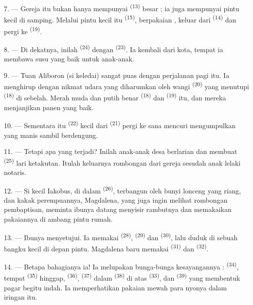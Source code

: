 7. --- Gereja itu bukan hanya mempunyai 
\textsuperscript{(13)} besar ; ia juga mempunyai pintu kecil di
samping. Melalui pintu kecil itu  \textsuperscript{(15)},
berpakaian , keluar dari 
\textsuperscript{(14)} dan pergi ke 
\textsuperscript{(19)}.

8. --- Di dekatnya, inilah 
\textsuperscript{(24)} dengan  \textsuperscript{(23)}.
Ia kembali dari kota, tempat ia membawa susu yang baik untuk
anak-anak.

\VUsaut{4.0mm}
\VUsaut{3.4mm}

9. --- Tuan Aliboron (si keledai) sangat puas dengan perjalanan pagi
itu. Ia menghirup dengan nikmat udara yang diharumkan oleh wangi
 \textsuperscript{(20)} yang menutupi  \textsuperscript{(18)} di  sebelah. Merah muda
dan putih benar  \textsuperscript{(18)} dan
 \textsuperscript{(19)} itu, dan mereka
menjanjikan panen yang baik.

10. --- Sementara itu  \textsuperscript{(22)} kecil
dari  \textsuperscript{(21)} pergi ke sana mencuri
mengumpulkan  yang manis sambil berdengung.

11. --- Tetapi apa yang terjadi? Inilah anak-anak desa berlarian dan
membuat  \textsuperscript{(25)} lari ketakutan.
Itulah keluarnya rombongan dari gereja sesudah 
anak lelaki notaris.

12. --- Si kecil Iakobus, di dalam 
\textsuperscript{(26)}, terbangun oleh bunyi lonceng yang riang, dan
kakak perempuannya, Magdalena, yang juga ingin melihat rombongan
pembaptisan, meminta ibunya datang menyisir rambutnya dan
memakaikan pakaiannya di ambang pintu rumah.

13. --- Ibunya menyetujui. Ia memakai 
\textsuperscript{(28)},  \textsuperscript{(29)}
dan  \textsuperscript{(30)}, lalu duduk di sebuah
bangku kecil di depan pintu. Magdalena baru memakai  \textsuperscript{(31)} dan 
\textsuperscript{(32)}.

14. --- Betapa bahagianya ia! Ia melupakan bunga-bunga
kesayangannya :  \textsuperscript{(34)}, tempat
 \textsuperscript{(35)} hinggap,  \textsuperscript{(36)}, 
\textsuperscript{(37)} dalam  \textsuperscript{(38)} di atas
 \textsuperscript{(33)}, dan 
\textsuperscript{(39)} yang membentuk pagar begitu indah. Ia
memperhatikan pakaian mewah para nyonya dalam iringan itu.

